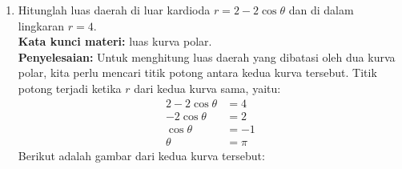 \documentclass[10pt,openany,a4paper]{article}
\theoremstyle{definition}
\theoremstyle{definition}
\theoremstyle{plain}
\newenvironment{jawab}[2][tes]{
\textbf{Kata kunci materi:} #1.\\
\textbf{Penyelesaian:} #2
}{}
\begin{document}
\begin{enumerate}
\begin{center}
            \end{center}
            Karena kurva tersebut simetris terhadap sumbu x, kita dapat menghitung luasnya dengan mengalikan dua kali luas daerah yang dibatasi oleh kurva tersebut pada interval $\theta$ dari $0$ hingga $\pi$. Dengan demikian, kita dapat menghitung luasnya sebagai berikut:
            \begin{align*}
                L &= 2\int_0^{\pi} \frac{1}{2}(2+2\cos \theta)^2 \, d\theta\\
                &= 2\frac{1}{2} \int_0^{\pi} 4(1+\cos \theta)^2 \, d\theta\\
                &= 4 \int_0^{\pi} (1 + 2\cos \theta + \cos^2 \theta) \, d\theta\\
                &= 4 \int_0^{\pi} \left(1 + 2\cos \theta + \frac{1 + \cos(2\theta)}{2}\right) \, d\theta\\
                &= 4 \int_0^{\pi} \left(\frac{3}{2} + 2\cos \theta + \frac{\cos(2\theta)}{2}\right) \, d\theta\\
                &= 4 \left[\frac{3}{2}\theta + 2\sin \theta + \frac{\sin(2\theta)}{4}\right]_0^{\pi}\\
                &= 6\pi 
            \end{align*}
            \item Hitunglah luas daerah di luar kardioda $r=2-2\cos\theta$ dan di dalam lingkaran $r=4$.\\
            \begin{jawab}[luas kurva polar]{
                Untuk menghitung luas daerah yang dibatasi oleh dua kurva polar, kita perlu mencari titik potong antara kedua kurva tersebut. Titik potong terjadi ketika $r$ dari kedua kurva sama, yaitu:
\begin{align*}
2 - 2\cos \theta &= 4\\
-2\cos \theta &= 2\\
\cos \theta &= -1\\
\theta &= \pi
\end{align*}
Berikut adalah gambar dari kedua kurva tersebut:
            \begin{center}

\end{center}}
\end{jawab}
\end{enumerate}
\end{document}
